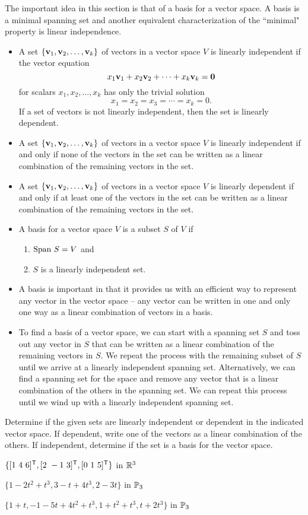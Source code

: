 The important idea in this section is that of a basis for a vector space. A basis is a minimal spanning set and another equivalent characterization of the ``minimal" property is linear independence.
\begin{itemize}
\item A set $\{\mathbf{v}_1, \mathbf{v}_2, \ldots, \mathbf{v}_k\}$ of vectors in a vector space $V$ is linearly independent if the vector equation
\[x_1 \mathbf{v}_1 + x_2 \mathbf{v}_2 + \cdots + x_k \mathbf{v}_k = \mathbf{0}\]
for scalars $x_1, x_2, \ldots, x_k$ has only the trivial solution
\[x_1 = x_2 = x_3 = \cdots = x_k = 0.\]
If a set of vectors is not linearly independent, then the set is linearly dependent.
\item A set $\{\mathbf{v}_1, \mathbf{v}_2, \ldots, \mathbf{v}_k\}$ of vectors in a vector space $V$ is linearly independent if and only if none of the vectors in the set can be written as a linear combination of the remaining vectors in the set.
\item A set $\{\mathbf{v}_1, \mathbf{v}_2, \ldots, \mathbf{v}_k\}$ of vectors in a vector space $V$ is linearly dependent if and only if at least one of the vectors in the set can be written as a linear combination of the remaining vectors in the set.
\item A basis for a vector space $V$ is a subset $S$ of $V$ if
\begin{enumerate}
\item $\text{Span} \ S = V$ and
\item $S$ is a linearly independent set.
\end{enumerate}
\item A basis is important in that it provides us with an efficient way to represent any vector in the vector space -- any vector can be written in one and only one way as a linear combination of vectors in a basis.
\item To find a basis of a vector space, we can start with a spanning set $S$ and toss out any vector in $S$ that can be written as a linear combination of the remaining vectors in $S$. We repeat the process with the remaining subset of $S$ until we arrive at a linearly independent spanning set. Alternatively, we can find a spanning set for the space and remove any vector that is a linear combination of the others in the spanning set. We can repeat this process until we wind up with a linearly independent spanning set. 
\end{itemize}

\be
\item Determine if the given sets are linearly independent or dependent in the indicated vector space. If dependent, write one of the vectors as a linear combination of the others. If independent, determine if the set is a basis for the vector space. 
	\ba
	\item $\{[1 \ 4 \ 6]^{\mathsf{T}}, [2 \ -1 \ 3]^{\mathsf{T}}, [0 \ 1 \ 5]^{\mathsf{T}}\}$ in $\mathbb{R}^3$
	\item $\{1-2t^2+t^3, 3-t+4t^3, 2-3t\}$ in $\mathbb{P}_3$
	\item $\{1+t, -1-5t+4t^2+t^3, 1+t^2+t^3, t+2t^3\}$ in $\mathbb{P}_3$


